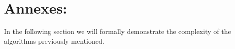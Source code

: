 \section{Annexes:}

In the following section we will formally demonstrate the complexity of the algorithms previously mentioned.